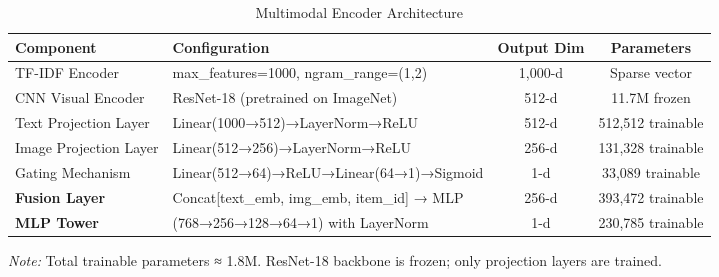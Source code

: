\begin{table}[htbp]
\centering
\small
\caption{Multimodal Encoder Architecture}
\label{tab:encoder_config}
\begin{tabular}{llcc}
\toprule
\textbf{Component} & \textbf{Configuration} & \textbf{Output Dim} & \textbf{Parameters} \\
\midrule
TF-IDF Encoder & max\_features=1000, ngram\_range=(1,2) & 1,000-d & Sparse vector \\
CNN Visual Encoder & ResNet-18 (pretrained on ImageNet) & 512-d & 11.7M frozen \\
Text Projection Layer & Linear(1000→512)→LayerNorm→ReLU & 512-d & 512,512 trainable \\
Image Projection Layer & Linear(512→256)→LayerNorm→ReLU & 256-d & 131,328 trainable \\
Gating Mechanism & Linear(512→64)→ReLU→Linear(64→1)→Sigmoid & 1-d & 33,089 trainable \\
\midrule
\textbf{Fusion Layer} & Concat[text\_emb, img\_emb, item\_id] → MLP & 256-d & 393,472 trainable \\
\midrule
\textbf{MLP Tower} & (768→256→128→64→1) with LayerNorm & 1-d & 230,785 trainable \\
\bottomrule
\end{tabular}
\end{table}

\vspace{0.5em}
\textit{Note:} Total trainable parameters ≈ 1.8M. ResNet-18 backbone is frozen; only projection layers are trained.


